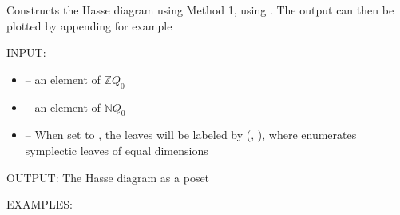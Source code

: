 \documentclass[letterpaper,10pt,english]{sphinxmanual}
\begin{document}
\begin{fulllineitems}
\label{\detokenize{index:quivercombinatorics.quivercombinatorics.Quiver.plot_Hasse_diagram_method_1}}
\pysigstartsignatures
\pysiglinewithargsret
{}
{\sphinxparamcomma {}\sphinxparamcomma {}}
{}
\pysigstopsignatures
\sphinxAtStartPar
Constructs the Hasse diagram using Method 1, using . The output can then be plotted by appending  for example

\sphinxAtStartPar
INPUT:
\begin{itemize}
\item {} 
\sphinxAtStartPar
{} – an element of \(\mathbb{Z}Q_0\)

\item {} 
\sphinxAtStartPar
{} – an element of \(\mathbb{N}Q_0\)

\item {} 
\sphinxAtStartPar
{} – When set to , the leaves will be labeled by (, ), where  enumerates symplectic leaves of equal dimensions

\end{itemize}

\sphinxAtStartPar
OUTPUT: The Hasse diagram as a poset

\sphinxAtStartPar
EXAMPLES:

\begin{sphinxVerbatim}[commandchars=\\\{\}]
  
   \PYG{p}{[}\PYG{p}{[}  \PYG{p}{]} \PYG{p}{[}  \PYG{p}{]} \PYG{p}{[}  \PYG{p}{]}\PYG{p}{]}
   
      
    


\end{sphinxVerbatim}
\end{fulllineitems}
\end{document}
